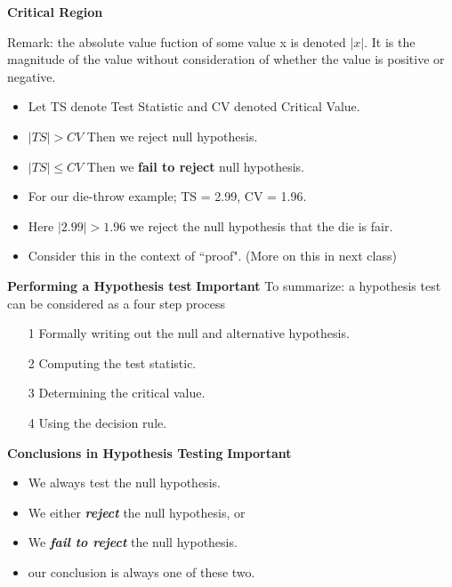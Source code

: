 \documentclass[a4]{beamer}
\begin{document}
\noindent \textbf{Critical Region }

Remark: the absolute value fuction of some value x is denoted $|x|$. It is the magnitude of the value without consideration of whether the value is positive or negative.


\begin{itemize}
\item Let TS denote Test Statistic and CV denoted Critical Value.
\item $|TS| > CV$ Then we reject null hypothesis.
\item $|TS| \leq CV$ Then we \textbf{fail to reject} null hypothesis.

\item For our die-throw example; TS = 2.99, CV = 1.96.
\item Here $|2.99| > 1.96$ we reject the null hypothesis that the die is fair.
\item Consider this in the context of ``proof". (More on this in next class)
\end{itemize}





\noindent \textbf{Performing a Hypothesis test}
\textbf{Important}
To summarize: a hypothesis test can be considered as a four step process
\begin{itemize}
\item[1] Formally writing out the null and alternative hypothesis.
\item[2] Computing the test statistic.
\item[3] Determining the critical value.
\item[4] Using the decision rule.
\end{itemize}



{
\noindent \textbf{Conclusions in Hypothesis Testing}
\textbf{Important}
\begin{itemize}
\item We always test the null hypothesis.
\item We either \textbf{\emph{reject}} the null hypothesis, or
\item We \textbf{\emph{ fail to reject}} the null hypothesis.
\item our conclusion is always one of these two.
\end{itemize}
}
\end{document}
